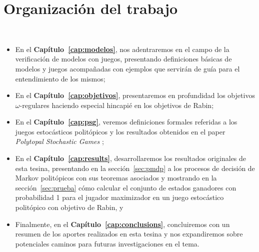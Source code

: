 \section{Organización del trabajo}
~\label{cap:intro:sec:outline}
\begin{itemize}
	\item En el \textbf{Capítulo~\ref{cap:modelos}}, nos adentraremos en el campo de la
	      verificación de modelos con juegos, presentando definiciones básicas de modelos
	      y juegos acompañadas con ejemplos que servirán de guía para el entendimiento de
	      los mismos;

	\item En el \textbf{Capítulo~\ref{cap:objetivos}}, presentaremos en profundidad los
	      objetivos $\omega$-regulares haciendo especial hincapié en los objetivos de
	      Rabin;

	\item En el \textbf{Capítulo~\ref{cap:psg}}, veremos definiciones formales referidas
	      a los juegos estocásticos politópicos y los resultados obtenidos en el paper
	      \textit{Polytopal Stochastic Games} \cite{Polytopal};

	\item En el \textbf{Capítulo~\ref{cap:results}}, desarrollaremos los resultados
	      originales de esta tesina, presentando en la sección~\ref{sec:pmdp} a los
	      procesos de decisión de Markov politópicos con sus teoremas asociados y
	      mostrando en la sección~\ref{sec:prueba} cómo calcular el conjunto de estados
	      ganadores con probabilidad 1 para el jugador maximizador en un juego
	      estocástico politópico con objetivo de Rabin, y

	\item Finalmente, en el \textbf{Capítulo~\ref{cap:conclusions}}, concluiremos con un
	      resumen de los aportes realizados en esta tesina y nos expandiremos sobre
	      potenciales caminos para futuras investigaciones en el tema.

\end{itemize}

